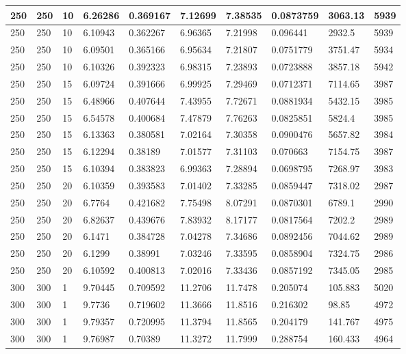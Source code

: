 \begin{landscape}
\begin{longtable}{ | l | l | l | l | l | l | l | l | l | l | }
250 & 250 & 10 & 6.26286 & 0.369167 & 7.12699 & 7.38535 & 0.0873759 & 3063.13 & 5939\\ \hline
250 & 250 & 10 & 6.10943 & 0.362267 & 6.96365 & 7.21998 & 0.096441 & 2932.5 & 5939\\ \hline
250 & 250 & 10 & 6.09501 & 0.365166 & 6.95634 & 7.21807 & 0.0751779 & 3751.47 & 5934\\ \hline
250 & 250 & 10 & 6.10326 & 0.392323 & 6.98315 & 7.23893 & 0.0723888 & 3857.18 & 5942\\ \hline
250 & 250 & 15 & 6.09724 & 0.391666 & 6.99925 & 7.29469 & 0.0712371 & 7114.65 & 3987\\ \hline
250 & 250 & 15 & 6.48966 & 0.407644 & 7.43955 & 7.72671 & 0.0881934 & 5432.15 & 3985\\ \hline
250 & 250 & 15 & 6.54578 & 0.400684 & 7.47879 & 7.76263 & 0.0825851 & 5824.4 & 3985\\ \hline
250 & 250 & 15 & 6.13363 & 0.380581 & 7.02164 & 7.30358 & 0.0900476 & 5657.82 & 3984\\ \hline
250 & 250 & 15 & 6.12294 & 0.38189 & 7.01577 & 7.31103 & 0.070663 & 7154.75 & 3987\\ \hline
250 & 250 & 15 & 6.10394 & 0.383823 & 6.99363 & 7.28894 & 0.0698795 & 7268.97 & 3983\\ \hline
250 & 250 & 20 & 6.10359 & 0.393583 & 7.01402 & 7.33285 & 0.0859447 & 7318.02 & 2987\\ \hline
250 & 250 & 20 & 6.7764 & 0.421682 & 7.75498 & 8.07291 & 0.0870301 & 6789.1 & 2990\\ \hline
250 & 250 & 20 & 6.82637 & 0.439676 & 7.83932 & 8.17177 & 0.0817564 & 7202.2 & 2989\\ \hline
250 & 250 & 20 & 6.1471 & 0.384728 & 7.04278 & 7.34686 & 0.0892456 & 7044.62 & 2989\\ \hline
250 & 250 & 20 & 6.1299 & 0.38991 & 7.03246 & 7.33595 & 0.0858904 & 7324.75 & 2986\\ \hline
250 & 250 & 20 & 6.10592 & 0.400813 & 7.02016 & 7.33436 & 0.0857192 & 7345.05 & 2985\\ \hline
300 & 300 & 1 & 9.70445 & 0.709592 & 11.2706 & 11.7478 & 0.205074 & 105.883 & 5020\\ \hline
300 & 300 & 1 & 9.7736 & 0.719602 & 11.3666 & 11.8516 & 0.216302 & 98.85 & 4972\\ \hline
300 & 300 & 1 & 9.79357 & 0.720995 & 11.3794 & 11.8565 & 0.204179 & 141.767 & 4975\\ \hline
300 & 300 & 1 & 9.76987 & 0.70389 & 11.3272 & 11.7999 & 0.288754 & 160.433 & 4964\\ \hline

\end{longtable}
\end{landscape}
